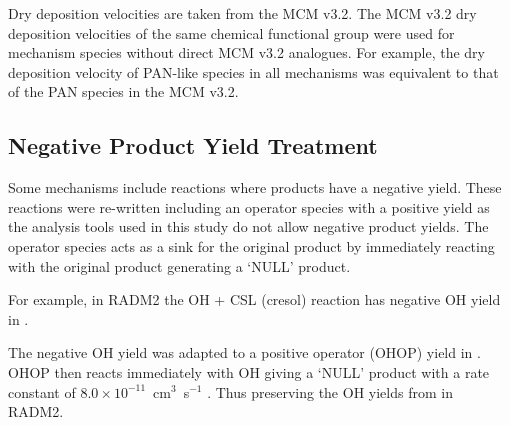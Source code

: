 Dry deposition velocities are taken from the MCM v3.2. 
The MCM v3.2 dry deposition velocities of the same chemical functional group were used for mechanism species without direct MCM v3.2 analogues. 
For example, the dry deposition velocity of PAN-like species in all mechanisms was equivalent to that of the PAN species in the MCM v3.2.

\subsection{Negative Product Yield Treatment}

Some mechanisms include reactions where products have a negative yield. 
These reactions were re-written including an operator species with a positive yield as the analysis tools used in this study do not allow negative product yields. 
The operator species acts as a sink for the original product by immediately reacting with the original product generating a `NULL' product. 

For example, in RADM2 the OH + CSL (cresol) reaction has negative OH yield in  \citep{Stockwell:1990}.
\begin{reactionlist}
\end{reactionlist}
The negative OH yield was adapted to a positive operator (OHOP) yield in .
OHOP then reacts immediately with OH giving a `NULL' product with a rate constant of \mbox{$8.0 \times 10^{-11}$ cm$^3$ s$^{-1}$} . 
Thus preserving the OH yields from  in RADM2.
\begin{reactionlist}
\end{reactionlist}
